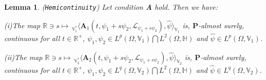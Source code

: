 \documentclass[11pt]{article}
\newtheorem{lemma}[theorem]{Lemma}
\numberwithin{equation}{section}
\begin{document}
\begin{lemma}(\texttt{Hemicontinuity})
\label{Hemicontinuity}
Let condition \textbf{A} hold. Then we have:

(i)The map $\mathbb{R}\ni s\mapsto\
_{\mathbb{V}^*_1}\big\langle \mathbf{A}_1(t,\psi_1+s\psi_2,
\mathcal{L}_{
\psi_1 +s \psi_2}) ,\widehat{\psi}\big\rangle_{\mathbb{V}_1}$ is,
$\mathbf{P}$-almost surely,   continuous
 for all $t\in\mathbb{R}^+$,
  $\psi_1,\psi_2\in
  L^p(\Omega, \mathbb{V}_1)
  \bigcap
  L^2(\Omega, \mathbb{H})$
  and
    $\widehat{\psi} \in
    L^p(\Omega,  \mathbb{V}_1)$.

(ii)The map $\mathbb{R} \ni s\mapsto\
_{\mathbb{V}^*_2}\big\langle \mathbf{A}_2(t,
\psi_1+s\psi_2,
\mathcal{L}_{\psi_1
+s \psi_2}) ,\widehat{\psi}\big\rangle_{\mathbb{V}_2}$ is,
$\mathbf{P}$-almost surely,   continuous
 for all $t\in\mathbb{R}^+$,
  $\psi_1,\psi_2\in
  L^q(\Omega, \mathbb{V}_2)
  \bigcap
  L^2(\Omega, \mathbb{H})$
  and
    $\widehat{\psi} \in
    L^q(\Omega,  \mathbb{V}_2)$.
\end{lemma}
\end{document}
